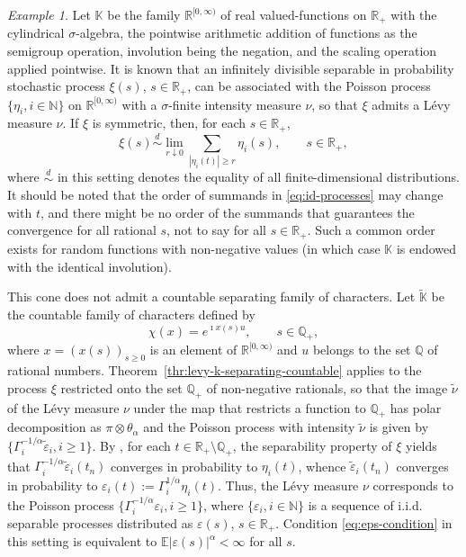 \documentclass[12pt]{amsart}
\numberwithin{equation}{section}
\numberwithin{figure}{section}
\theoremstyle{plain} \newtheorem{theorem}{Theorem}[section]
\theoremstyle{plain} \newtheorem{proposition}[theorem]{Proposition}
\theoremstyle{plain} \newtheorem{lemma}[theorem]{Lemma}
\theoremstyle{plain} \newtheorem{corollary}[theorem]{Corollary}
\theoremstyle{definition} \newtheorem{definition}[theorem]{Definition}
\theoremstyle{definition} \newtheorem{notation}[theorem]{Notation}
\theoremstyle{remark} \newtheorem{remark}[theorem]{Remark}
\theoremstyle{remark} \newtheorem{example}[theorem]{Example}
\theoremstyle{definition} \newtheorem{assumption}{Assumption}
\newcommand{\bE}{\mathbb{E}}
\newcommand{\bK}{\mathbb{K}}
\newcommand{\bN}{\mathbb{N}}
\newcommand{\bQ}{\mathbb{Q}}
\newcommand{\bR}{\mathbb{R}}
\newcommand{\bKD}{\tilde{\bK}}
\renewcommand{\epsilon}{\varepsilon}
\newcommand{\eps}{\epsilon}
\newcommand{\eqd}{\overset{d}{\sim}}
\begin{document}
\begin{example}
  \label{ex:processes-values}
  Let $\bK$ be the family $\bR^{[0,\infty)}$ of real valued-functions
  on $\bR_+$ with the cylindrical $\sigma$-algebra, the pointwise arithmetic
  addition of functions as the semigroup operation, involution being
  the negation, and the scaling operation applied pointwise.
	It is known \cite{kab:stoev12,mar70} that an infinitely
  divisible separable in probability stochastic process $\xi(s)$,
  $s\in\bR_+$, can be associated with the Poisson process
  $\{\eta_i,i\in\bN\}$ on $\bR^{[0,\infty)}$ with a $\sigma$-finite
  intensity measure $\nu$, so that $\xi$ admits a L\'evy measure
  $\nu$. If $\xi$ is symmetric, then, for each $s\in\bR_+$,
  \begin{equation}
    \label{eq:id-processes}
    \xi(s)\eqd \lim_{r\downarrow 0}\sum_{|\eta_i(t)|\geq r}
    \eta_i(s),\qquad s\in\bR_+,
  \end{equation}
  where $\eqd$ in this setting denotes the equality of all
  finite-dimensional distributions.  It should be noted that the order
  of summands in \eqref{eq:id-processes} may change with $t$, and
  there might be no order of the summands that guarantees the
  convergence for all rational $s$, not to say for all
  $s\in\bR_+$. Such a common order exists for random functions with
  non-negative values (in which case $\bK$ is endowed with the
  identical involution).
  
  This cone does not admit a countable separating family of
  characters.  Let $\bKD$ be the countable family of characters
  defined by
  \begin{equation}
    \label{Eq:chi-line}
    \chi(x)=e^{\imath x(s) u},\qquad s\in\bQ_+,
  \end{equation}
  where $x=(x(s))_{s\geq 0}$ is an element of $\bR^{[0,\infty)}$ and
  $u$ belongs to the set $\bQ$ of rational numbers.  
  Theorem~\ref{thr:levy-k-separating-countable} applies to the process
  $\xi$ restricted onto the set $\bQ_+$ of non-negative rationals, so
  that the image $\tilde{\nu}$ of the L\'evy measure $\nu$ under the
  map that restricts a function to $\bQ_+$ has polar decomposition as
  $\pi\otimes\theta_\alpha$ and the Poisson process with intensity
  $\tilde{\nu}$ is given by
  $\{\Gamma_i^{-1/\alpha}\tilde{\eps}_i,i\geq1\}$. By
  \cite[Prop.~2.19]{kab:stoev12}, for each $t\in\bR_+\setminus\bQ_+$,
  the separability property of $\xi$ yields that
  $\Gamma_i^{-1/\alpha}\tilde{\eps}_i(t_n)$ converges in probability
  to $\eta_i(t)$, whence $\tilde{\eps}_i(t_n)$ converges in
  probability to $\eps_i(t):=\Gamma_i^{1/\alpha}\eta_i(t)$. Thus, the
  L\'evy measure $\nu$ corresponds to the Poisson process
  $\{\Gamma_i^{-1/\alpha}\eps_i,i\geq1\}$, where $\{\eps_i,i\in\bN\}$
  is a sequence of i.i.d. separable processes distributed as
  $\eps(s)$, $s\in\bR_+$. Condition \eqref{eq:eps-condition} in this
  setting is equivalent to $\bE|\eps(s)|^\alpha<\infty$ for all
  $s$. 


\end{example}
\end{document}
